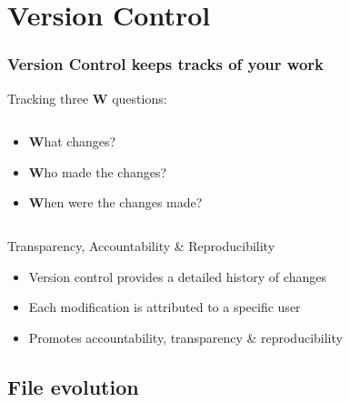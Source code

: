 \documentclass[xcolor=x11names,compress]{beamer}
\renewcommand{\(}{\begin{columns}}
\renewcommand{\)}{\end{columns}}
\newcommand{\<}[1]{\begin{column}{#1}}
\renewcommand{\>}{\end{column}}
\begin{document}
\section{Version Control}

\begin{frame} %
\frametitle{Version Control keeps tracks of your work}
Tracking three \textbf{W} questions:
\begin{columns}[t]
 \begin{column}{0.5\textwidth}
 \begin{itemize}[<+->]
 \item[] \textcolor{siap}{\textbf{W}}hat changes?
 \item[] \textcolor{siap}{\textbf{W}}ho made the changes?
 \item[] \textcolor{siap}{\textbf{W}}hen were the changes made?
 \end{itemize}
 \end{column}
  \begin{column}{0.5\textwidth}
    \begin{center}
    \begin{itemize}
    \end{itemize}
    \end{center}
  \end{column}
\end{columns}
\end{frame}



\begin{frame}{Transparency, Accountability \& Reproducibility}
    \begin{itemize}[<+->]
        \item Version control provides a detailed history of changes
        \item Each modification is attributed to a specific user
        \item Promotes accountability, transparency \&  reproducibility
    \end{itemize}
\end{frame}

\subsection{File evolution}
\end{document}
